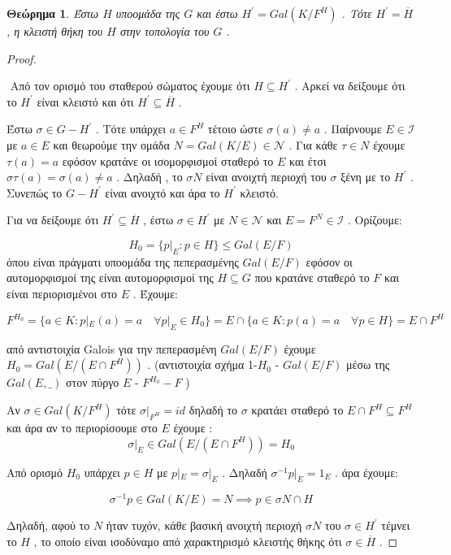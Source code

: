 \documentclass[oneside,a4paper]{article}
\newtheorem{theorem}{Θεώρημα}
\begin{document}
\begin{theorem}Έστω $H$ υποομάδα της $G$ και έστω $H^{\prime} = Gal(K/F^H)$ . Τότε $H^{\prime} = \overline{H}$ , η κλειστή θήκη του $H$ στην τοπολογία του $G$ .
\end{theorem}
\begin{proof} $ $


$ $\newline
Από τον ορισμό του σταθερού σώματος έχουμε ότι $H \subseteq H^{\prime}$ . Αρκεί να δείξουμε ότι το $H^{\prime}$ είναι κλειστό και ότι $H^{\prime} \subseteq \overline H$ . 

Έστω $\sigma \in G - H^{\prime}$ . Τότε υπάρχει $a \in F^H$ τέτοιο ώστε $\sigma (a) \neq a$ . Παίρνουμε $E \in \mathcal{I}$ με $a \in E$ και θεωρούμε την ομάδα $N = Gal(K/E) \in \mathcal{N}$ . Για κάθε $\tau \in N$ έχουμε $\tau (a) = a$ εφόσον κρατάνε οι ισομορφισμοί σταθερό το $E$ και έτσι $\sigma \tau (a) = \sigma (a) \neq a$ . Δηλαδή , το $\sigma N$ είναι ανοιχτή περιοχή του $\sigma$ ξένη με το $H^{\prime}$ . Συνεπώς το $G - H^{\prime}$ είναι ανοιχτό και άρα το $H^{\prime}$ κλειστό. 

Για να δείξουμε ότι $H^{\prime} \subseteq \overline H$ , έστω $\sigma \in H^{\prime}$ με $N \in \mathcal{N}$ και $E = F^N \in \mathcal{I}$ . Ορίζουμε:

$$H_0 = \{p|_E : p \in H\} \leq Gal(E/F)$$
όπου είναι πράγματι υποομάδα της πεπερασμένης $Gal(E/F)$ εφόσον οι αυτομορφισμοί της είναι αυτομορφισμοί της $H \subseteq G$ που κρατάνε σταθερό το $F$ και είναι περιορισμένοι στο $E$ .
Έχουμε:

$$F^{H_0} = \{ a \in K : p|_E (a) = a \quad\forall p|_E \in H_0\}= E \cap \{a 
\in K : p (a) = a \quad\forall  p \in H\}= E \cap F^H$$

από αντιστοιχία Galois για την πεπερασμένη $Gal(E/F)$ έχουμε $H_0 = Gal(E/(E\cap F^H))$ .
(αντιστοιχία  σχήμα 1-$H_0$ - $Gal(E/F)$ μέσω της $Gal(E, \_ )$ στον πύργο $E$ - $F^{H_0} - F$ )

Αν $\sigma \in Gal(K/F^H)$ τότε $\sigma|_{F^H} = id$ δηλαδή το $\sigma$ κρατάει σταθερό το $E \cap F^H \subseteq F^H$ και άρα αν το περιορίσουμε στο $E$ έχουμε :
$$\sigma|_E \in Gal(E/ (E\cap F^H)) = H_0$$

Από ορισμό $H_0$ υπάρχει $p \in H$ με $p|_E = \sigma|_E$ . Δηλαδή $\sigma^{-1} p|_E = 1_E$ .
άρα έχουμε:

$$\sigma^{-1} p \in Gal(K/E) = N \implies p \in \sigma N \cap H$$

Δηλαδή, αφού το $N$ ήταν τυχόν, κάθε βασική ανοιχτή περιοχή $\sigma N$ του $\sigma \in H^{\prime}$  τέμνει το $H$ , το οποίο είναι ισοδύναμο από χαρακτηρισμό κλειστής θήκης ότι $\sigma \in \overline H$ .

\end{proof}
\end{document}
